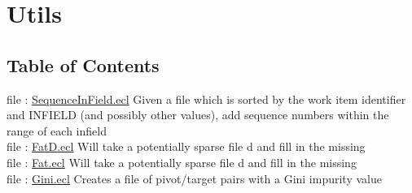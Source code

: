 \chapter*{Utils}
\hypertarget{ecldoc:toc:ML_Core/Utils}{}


\section*{Table of Contents}
file : \hyperlink{ecldoc:toc:ML_Core.Utils.SequenceInField}{SequenceInField.ecl}  Given a file which is sorted by the work item identifier and INFIELD (and possibly other values), add sequence numbers within the range of each infield \\
file : \hyperlink{ecldoc:toc:ML_Core.Utils.FatD}{FatD.ecl}  Will take a potentially sparse file d and fill in the missing \\
file : \hyperlink{ecldoc:toc:ML_Core.Utils.Fat}{Fat.ecl}  Will take a potentially sparse file d and fill in the missing \\
file : \hyperlink{ecldoc:toc:ML_Core.Utils.Gini}{Gini.ecl}  Creates a file of pivot/target pairs with a Gini impurity value \\





